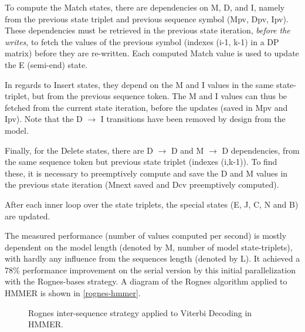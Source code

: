 To compute the Match states, there are dependencies on M, D, and I, namely from the previous state triplet and previous sequence symbol (Mpv, Dpv, Ipv). These dependencies must be retrieved in the previous state iteration, \emph{before the writes}, to fetch the values of the previous symbol (indexes (i-1, k-1) in a \ac{DP} matrix) before they are re-written.
Each computed Match value is used to update the E (semi-end) state. 

In regards to Insert states, they depend on the M and I values in the same state-triplet, but from the previous sequence token. The M and I values can thus be fetched from the current state iteration, before the updates (saved in Mpv and Ipv).
Note that the D $\rightarrow$ I transitions have been removed by design from the model.

Finally, for the Delete states, there are D $\rightarrow$  D and M $\rightarrow$  D dependencies, from the same sequence token but previous state triplet (indexes (i,k-1)). To find these, it is necessary to preemptively compute and save the D and M values in the previous state iteration (Mnext saved and Dcv preemptively computed).

After each inner loop over the state triplets, the special states (E, J, C, N and B) are updated.


The measured performance (number of values computed per second) is mostly dependent on the model length (denoted by M, number of model state-triplets), with hardly any influence from the sequences length (denoted by L).
It achieved a 78\% performance improvement on the serial version by this initial parallelization with the Rognes-bases strategy. A diagram of the Rognes algorithm applied to HMMER is shown in \autoref{rognes-hmmer}.

\begin{figure}[htb!]
  \begin{center}
    \caption[Vectorization of the Viterbi algorithm] {Rognes inter-sequence strategy applied to Viterbi Decoding in HMMER.}
    \label{rognes-hmmer}
  \end{center}
\end{figure}



